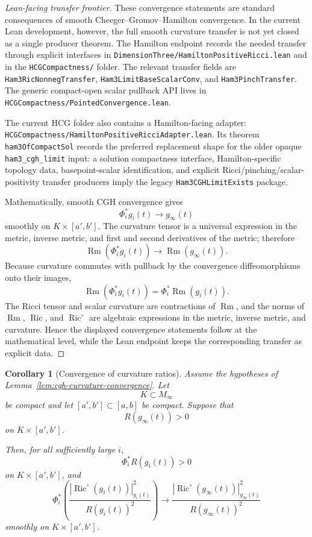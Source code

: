 \documentclass[11pt]{article}
\theoremstyle{plain}
\newtheorem{corollary}[theorem]{Corollary}
\theoremstyle{definition}
\theoremstyle{remark}
\newcommand{\Ric}{\operatorname{Ric}}
\newcommand{\Rm}{\operatorname{Rm}}
\newcommand{\norm}[1]{\left|#1\right|}
\newcommand{\leanref}[1]{\nolinkurl{#1}}
\newcommand{\leanfile}[1]{\nolinkurl{#1}}
\newcommand{\rffile}[1]{\leanfile{#1}}
\newcommand{\rfdir}[1]{\leanfile{#1/}}
\begin{document}
\begin{proof}[Lean-facing transfer frontier]
These convergence statements are standard consequences of smooth
Cheeger--Gromov--Hamilton convergence.  In the current Lean development,
however, the full smooth curvature transfer is not yet closed as a single
producer theorem.  The Hamilton endpoint records the needed transfer through
explicit interfaces in \rffile{DimensionThree/HamiltonPositiveRicci.lean} and in the
\rfdir{HCGCompactness} folder.  The relevant transfer fields are
\leanref{Ham3RicNonnegTransfer}, \leanref{Ham3LimitBaseScalarConv}, and
\leanref{Ham3PinchTransfer}.  The generic compact-open scalar pullback API lives
in \rffile{HCGCompactness/PointedConvergence.lean}.

The current HCG folder also contains a Hamilton-facing adapter:
\rffile{HCGCompactness/HamiltonPositiveRicciAdapter.lean}.  Its theorem
\leanref{ham3OfCompactSol} records the preferred replacement shape for the
older opaque \leanref{ham3_cgh_limit} input: a solution compactness interface,
Hamilton-specific topology data, basepoint-scalar identification, and explicit
Ricci/pinching/scalar-positivity transfer producers imply the legacy
\leanref{Ham3CGHLimitExists} package.

Mathematically, smooth CGH convergence gives
\[
\Phi_i^*g_i(t)\to g_\infty(t)
\]
smoothly on $K\times [a',b']$.  The curvature tensor is a universal expression
in the metric, inverse metric, and first and second derivatives of the metric;
therefore
\[
\Rm(\Phi_i^*g_i(t))\to \Rm(g_\infty(t)).
\]
Because curvature commutes with pullback by the convergence diffeomorphisms
onto their images,
\[
\Rm(\Phi_i^*g_i(t))=\Phi_i^*\Rm(g_i(t)).
\]
The Ricci tensor and scalar curvature are contractions of \(\Rm\), and the
norms of \(\Rm\), \(\Ric\), and \(\Ric^\circ\) are algebraic expressions in
the metric, inverse metric, and curvature.  Hence the displayed convergence
statements follow at the mathematical level, while the Lean endpoint keeps the
corresponding transfer as explicit data.
\end{proof}

\begin{corollary}[Convergence of curvature ratios]
\label{cor:cgh-curvature-ratio-convergence}
Assume the hypotheses of Lemma~\ref{lem:cgh-curvature-convergence}. Let
\[
K\subset M_\infty
\]
be compact and let $[a',b']\subset [a,b]$ be compact. Suppose that
\[
R(g_\infty(t))>0
\]
on $K\times [a',b']$.

Then, for all sufficiently large $i$,
\[
\Phi_i^*R(g_i(t))>0
\]
on $K\times [a',b']$, and
\[
\Phi_i^*
\left(
\frac{\norm{\Ric^\circ(g_i(t))}_{g_i(t)}^2}{R(g_i(t))^2}
\right)
\to
\frac{\norm{\Ric^\circ(g_\infty(t))}_{g_\infty(t)}^2}{R(g_\infty(t))^2}
\]
smoothly on $K\times [a',b']$.
\end{corollary}
\end{document}
